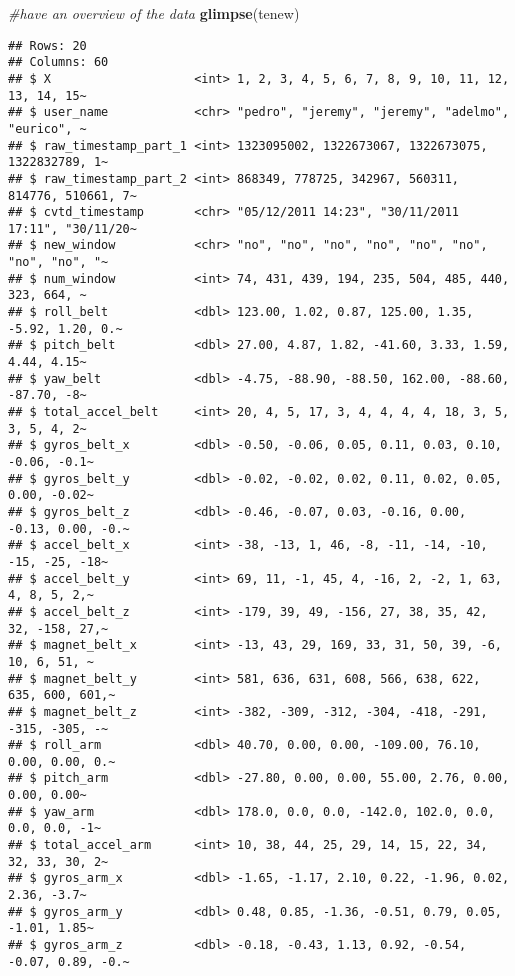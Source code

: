\documentclass[]{article}
\newenvironment{Shaded}{\begin{snugshade}}{\end{snugshade}}
\newcommand{\CommentTok}[1]{\textcolor[rgb]{0.56,0.35,0.01}{\textit{#1}}}
\newcommand{\KeywordTok}[1]{\textcolor[rgb]{0.13,0.29,0.53}{\textbf{#1}}}
\newcommand{\NormalTok}[1]{#1}
\begin{document}
\begin{Shaded}
\begin{Highlighting}[]
\CommentTok{#have an overview of the data}
\KeywordTok{glimpse}\NormalTok{(tenew)}
\end{Highlighting}
\end{Shaded}

\begin{verbatim}
## Rows: 20
## Columns: 60
## $ X                    <int> 1, 2, 3, 4, 5, 6, 7, 8, 9, 10, 11, 12, 13, 14, 15~
## $ user_name            <chr> "pedro", "jeremy", "jeremy", "adelmo", "eurico", ~
## $ raw_timestamp_part_1 <int> 1323095002, 1322673067, 1322673075, 1322832789, 1~
## $ raw_timestamp_part_2 <int> 868349, 778725, 342967, 560311, 814776, 510661, 7~
## $ cvtd_timestamp       <chr> "05/12/2011 14:23", "30/11/2011 17:11", "30/11/20~
## $ new_window           <chr> "no", "no", "no", "no", "no", "no", "no", "no", "~
## $ num_window           <int> 74, 431, 439, 194, 235, 504, 485, 440, 323, 664, ~
## $ roll_belt            <dbl> 123.00, 1.02, 0.87, 125.00, 1.35, -5.92, 1.20, 0.~
## $ pitch_belt           <dbl> 27.00, 4.87, 1.82, -41.60, 3.33, 1.59, 4.44, 4.15~
## $ yaw_belt             <dbl> -4.75, -88.90, -88.50, 162.00, -88.60, -87.70, -8~
## $ total_accel_belt     <int> 20, 4, 5, 17, 3, 4, 4, 4, 4, 18, 3, 5, 3, 5, 4, 2~
## $ gyros_belt_x         <dbl> -0.50, -0.06, 0.05, 0.11, 0.03, 0.10, -0.06, -0.1~
## $ gyros_belt_y         <dbl> -0.02, -0.02, 0.02, 0.11, 0.02, 0.05, 0.00, -0.02~
## $ gyros_belt_z         <dbl> -0.46, -0.07, 0.03, -0.16, 0.00, -0.13, 0.00, -0.~
## $ accel_belt_x         <int> -38, -13, 1, 46, -8, -11, -14, -10, -15, -25, -18~
## $ accel_belt_y         <int> 69, 11, -1, 45, 4, -16, 2, -2, 1, 63, 4, 8, 5, 2,~
## $ accel_belt_z         <int> -179, 39, 49, -156, 27, 38, 35, 42, 32, -158, 27,~
## $ magnet_belt_x        <int> -13, 43, 29, 169, 33, 31, 50, 39, -6, 10, 6, 51, ~
## $ magnet_belt_y        <int> 581, 636, 631, 608, 566, 638, 622, 635, 600, 601,~
## $ magnet_belt_z        <int> -382, -309, -312, -304, -418, -291, -315, -305, -~
## $ roll_arm             <dbl> 40.70, 0.00, 0.00, -109.00, 76.10, 0.00, 0.00, 0.~
## $ pitch_arm            <dbl> -27.80, 0.00, 0.00, 55.00, 2.76, 0.00, 0.00, 0.00~
## $ yaw_arm              <dbl> 178.0, 0.0, 0.0, -142.0, 102.0, 0.0, 0.0, 0.0, -1~
## $ total_accel_arm      <int> 10, 38, 44, 25, 29, 14, 15, 22, 34, 32, 33, 30, 2~
## $ gyros_arm_x          <dbl> -1.65, -1.17, 2.10, 0.22, -1.96, 0.02, 2.36, -3.7~
## $ gyros_arm_y          <dbl> 0.48, 0.85, -1.36, -0.51, 0.79, 0.05, -1.01, 1.85~
## $ gyros_arm_z          <dbl> -0.18, -0.43, 1.13, 0.92, -0.54, -0.07, 0.89, -0.~

\end{verbatim}
\end{document}
